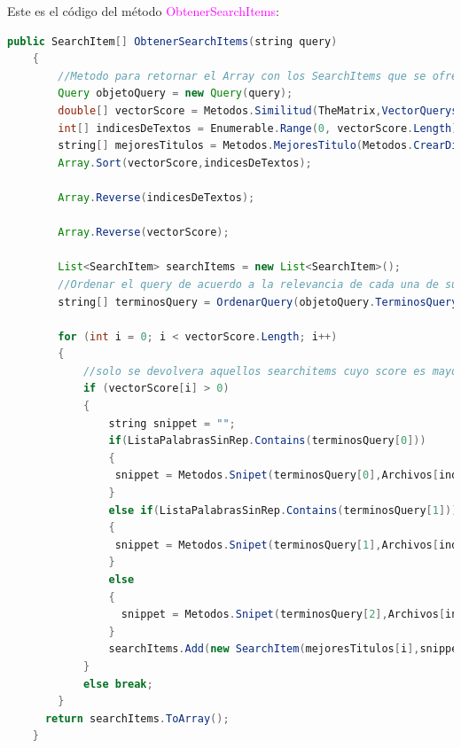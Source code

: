 \documentclass[a4paper, 12pt]{article}
\begin{document}
Este es el código del método  \textcolor{magenta}{ObtenerSearchItems}:
\begin{lstlisting}[language=Java]
public SearchItem[] ObtenerSearchItems(string query)
    {
        //Metodo para retornar el Array con los SearchItems que se ofreceran al usuario
        Query objetoQuery = new Query(query);
        double[] vectorScore = Metodos.Similitud(TheMatrix,VectorQuerys(query, Archivos.Length));
        int[] indicesDeTextos = Enumerable.Range(0, vectorScore.Length).ToArray();
        string[] mejoresTitulos = Metodos.MejoresTitulo(Metodos.CrearDiccionario(Titulos,vectorScore));
        Array.Sort(vectorScore,indicesDeTextos);

        Array.Reverse(indicesDeTextos);

        Array.Reverse(vectorScore);
        
        List<SearchItem> searchItems = new List<SearchItem>();
        //Ordenar el query de acuerdo a la relevancia de cada una de sus palabras
        string[] terminosQuery = OrdenarQuery(objetoQuery.TerminosQuery, VectorQuerys(query,Archivos.Length));
     
        for (int i = 0; i < vectorScore.Length; i++)
        {
            //solo se devolvera aquellos searchitems cuyo score es mayor que cerp
            if (vectorScore[i] > 0)
            {
                string snippet = "";
                if(ListaPalabrasSinRep.Contains(terminosQuery[0]))
                {
                 snippet = Metodos.Snipet(terminosQuery[0],Archivos[indicesDeTextos[i]]);
                }
                else if(ListaPalabrasSinRep.Contains(terminosQuery[1]))
                {
                 snippet = Metodos.Snipet(terminosQuery[1],Archivos[indicesDeTextos[i]]);   
                }
                else
                {
                  snippet = Metodos.Snipet(terminosQuery[2],Archivos[indicesDeTextos[i]]);   
                }
                searchItems.Add(new SearchItem(mejoresTitulos[i],snippet,(float)vectorScore[i]));
            }
            else break;
        }
      return searchItems.ToArray();
    }

\end{lstlisting}
\end{document}
